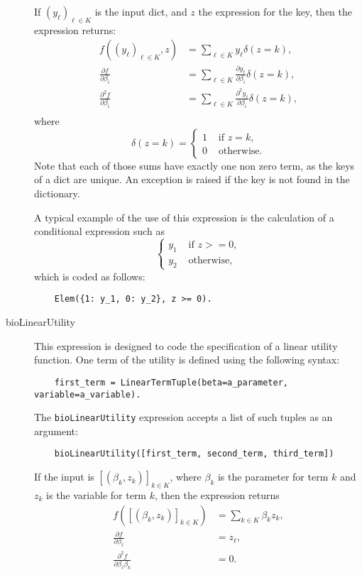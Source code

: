 \documentclass[12pt,a4paper]{article}
\begin{document}
\begin{description}
\begin{lstlisting}
  \end{lstlisting}
  If $(y_\ell)_{\ell\in K}$ is the input dict, and $z$ the expression for the key, then the expression returns:
  \begin{align*}
f((y_\ell)_{\ell\in K}, z) &= \sum_{\ell \in K} y_\ell \delta(z = k), \\
\frac{\partial f}{\partial \beta_i} &= \sum_{\ell \in K} \frac{\partial y_\ell}{\partial \beta_i} \delta(z = k), \\
\frac{\partial^2 f}{\partial \beta_i} &= \sum_{\ell \in K} \frac{\partial^2 y_\ell}{\partial \beta_i} \delta(z = k), \\
  \end{align*}
    where
  \[
  \delta(z=k) = \left\{
  \begin{aligned}
    1 & \text{ if } z = k, \\
    0 & \text{ otherwise.}
  \end{aligned}
  \right.
  \]
  Note that each of those sums have exactly one non zero term, as the
  keys of a dict are unique. An exception is raised if the key is not found in the dictionary.

  A typical example of the use of this expression is the calculation of a conditional expression such as
  \[
     \left\{
  \begin{aligned}
    y_1 & \text{ if } z >= 0, \\
    y_2 & \text{ otherwise},
  \end{aligned}
  \right.
  \]
  which is coded as follows:
  \begin{lstlisting}
    Elem({1: y_1, 0: y_2}, z >= 0).
  \end{lstlisting}

\item[bioLinearUtility] This expression is designed to code the specification of a linear utility function.  One term of the utility is defined using the following syntax:
  \begin{lstlisting}
    first_term = LinearTermTuple(beta=a_parameter, variable=a_variable).
  \end{lstlisting}
  The \lstinline+bioLinearUtility+ expression accepts a list of such tuples as an argument:
  \begin{lstlisting}
    bioLinearUtility([first_term, second_term, third_term])
  \end{lstlisting}
  If the input is $[(\beta_k, z_k)]_{k\in K}$, where $\beta_k$ is the parameter for term $k$ and $z_k$ is the variable for term $k$,  then the expression returns
  \begin{align*}
  f([(\beta_k, z_k)]_{k\in K}) &= \sum_{k\in K} \beta_k z_k, \\
  \frac{\partial f}{\partial \beta_\ell} &= z_\ell, \\ 
  \frac{\partial^2 f}{\partial \beta_\ell \beta_k} &= 0. \\ 
  \end{align*}

  
\end{description}
\end{document}

